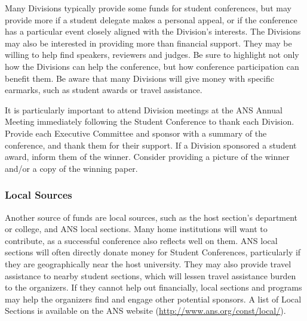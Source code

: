 \documentclass[12pt]{article}
\begin{document}
Many Divisions typically provide some funds for student conferences, but may provide more if a student delegate makes a personal appeal, or if the conference has a particular event closely aligned with the Division's interests.
The Divisions may also be interested in providing more than financial support.
They may be willing to help find speakers, reviewers and judges.
Be sure to highlight not only how the Divisions can help the conference, but how conference participation can benefit them.
Be aware that many Divisions will give money with specific earmarks, such as student awards or travel assistance.
 
It is particularly important to attend Division meetings at the ANS Annual Meeting immediately following the Student Conference to thank each Division.
Provide each Executive Committee and sponsor with a summary of the conference, and thank them for their support.
If a Division sponsored a student award, inform them of the winner.
Consider providing a picture of the winner and/or a copy of the winning paper.
 
\subsubsection{Local Sources}
Another source of funds are local sources, such as the host section's department or college, and ANS local sections. 
Many home institutions will want to contribute, as a successful conference also reflects well on them.
ANS local sections will often directly donate money for Student Conferences, particularly if they are geographically near the host university.
They may also provide travel assistance to nearby student sections, which will lessen travel assistance burden to the organizers.
If they cannot help out financially, local sections and programs may help the organizers find and engage other potential sponsors.
A list of Local Sections is available on the ANS website (\href{http://www.ans.org/const/local/}{http://www.ans.org/const/local/}).
\end{document}
